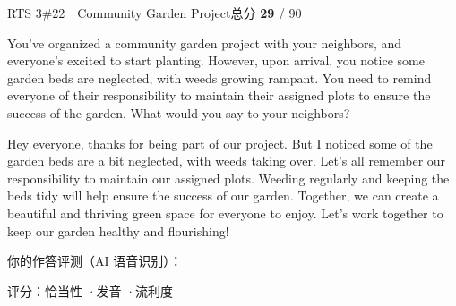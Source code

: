 \begin{qblock}{RTS 3\quad \#22\ \ Community Garden Project}{总分 \textcolor{cAccent}{\bfseries 29} / 90}
\begin{promptbox}
You've organized a community garden project with your neighbors, and everyone's excited to start planting. However, upon arrival, you notice some garden beds are neglected, with weeds growing rampant. You need to remind everyone of their responsibility to maintain their assigned plots to ensure the success of the garden. What would you say to your neighbors?
\end{promptbox}
\begin{modelbox}
Hey everyone, thanks for being part of our project. But I noticed some of the garden beds are a bit neglected, with weeds taking over. Let's all remember our responsibility to maintain our assigned plots. Weeding regularly and keeping the beds tidy will help ensure the success of our garden. Together, we can create a beautiful and thriving green space for everyone to enjoy. Let's work together to keep our garden healthy and flourishing!
\end{modelbox}
\smallskip\par{\footnotesize\color{gray}你的作答评测（AI 语音识别）：}
\begin{asrbox}
                   
\end{asrbox}
{\small 评分：恰当性 \quad·\quad 发音 \quad·\quad 流利度 }
\end{qblock}


